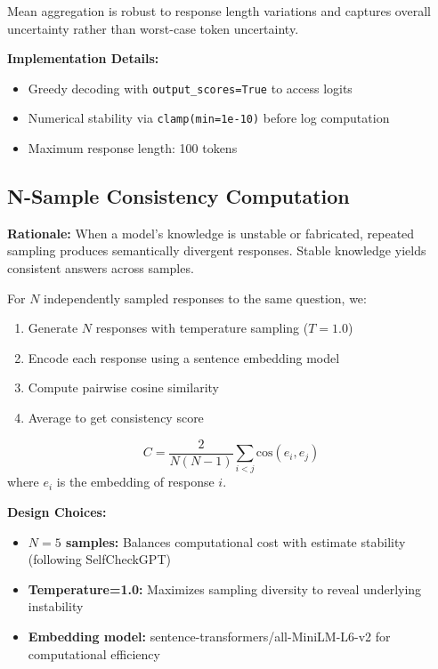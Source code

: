 Mean aggregation is robust to response length variations and captures overall uncertainty rather than worst-case token uncertainty.

\textbf{Implementation Details:}
\begin{itemize}
    \item Greedy decoding with \texttt{output\_scores=True} to access logits
    \item Numerical stability via \texttt{clamp(min=1e-10)} before log computation
    \item Maximum response length: 100 tokens
\end{itemize}

\subsection{N-Sample Consistency Computation}

\textbf{Rationale:} When a model's knowledge is unstable or fabricated, repeated sampling produces semantically divergent responses. Stable knowledge yields consistent answers across samples.

For $N$ independently sampled responses to the same question, we:
\begin{enumerate}
    \item Generate $N$ responses with temperature sampling ($T=1.0$)
    \item Encode each response using a sentence embedding model
    \item Compute pairwise cosine similarity
    \item Average to get consistency score
\end{enumerate}

\begin{equation}
C = \frac{2}{N(N-1)} \sum_{i < j} \text{cos}(e_i, e_j)
\end{equation}
where $e_i$ is the embedding of response $i$.

\textbf{Design Choices:}
\begin{itemize}
    \item \textbf{$N=5$ samples:} Balances computational cost with estimate stability (following SelfCheckGPT)
    \item \textbf{Temperature=1.0:} Maximizes sampling diversity to reveal underlying instability
    \item \textbf{Embedding model:} sentence-transformers/all-MiniLM-L6-v2 for computational efficiency
\end{itemize}

